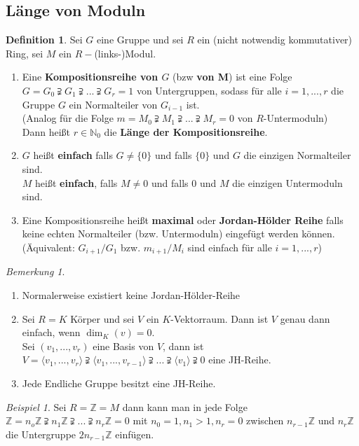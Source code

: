 \documentclass[10pt,a4paper]{article}
\newcommand{\N}{\ensuremath{\mathbb{N}}}
\newcommand{\Z}{\ensuremath{\mathbb{Z}}}
\newcounter{thm}[section]
\theoremstyle{definition}
\newtheorem{definition}[thm]{Definition}
\theoremstyle{plain}
\theoremstyle{remark}
\newtheorem{bem}[thm]{Bemerkung}
\newtheorem{exm}[thm]{Beispiel}
\begin{document}
\subsection{Länge von Moduln}

\begin{definition}
	Sei $G$ eine Gruppe und sei $R$ ein (nicht notwendig kommutativer) Ring, sei $M$ ein $R-$(links-)Modul.\begin{enumerate}
		\item Eine \textbf{Kompositionsreihe von $G$} (bzw \textbf{von M}) ist eine Folge $G=G_0\supsetneqq G_1\supsetneqq...\supsetneqq G_r=1$ von Untergruppen, sodass für alle $i=1,...,r$ die Gruppe $G$ ein Normalteiler von $G_{i-1}$ ist.\\
		(Analog für die Folge $m=M_0\supsetneqq M_1\supsetneqq...\supsetneqq M_r=0$ von $R$-Untermoduln)\\
		Dann heißt $r\in \N_0$ die \textbf{Länge der Kompositionsreihe}.
		\item $G$ heißt \textbf{einfach} falls $G\neq\{0\}$ und falls $\{0\}$ und $G$ die einzigen Normalteiler sind.\\
		$M$ heißt \textbf{einfach}, falls $M\neq 0$ und falls $0$ und $M$ die einzigen Untermoduln sind.
		\item Eine Kompositionsreihe heißt \textbf{maximal} oder \textbf{Jordan-Hölder Reihe} falls keine echten Normalteiler (bzw. Untermoduln) eingefügt werden können.\\
		(Äquivalent: $G_{i+1}/G_1$ bzw. $m_{i+1}/M_i$ sind einfach für alle $i=1,...,r$)
	\end{enumerate}
\end{definition}
\begin{bem}
	\begin{enumerate}
		\item Normalerweise existiert keine Jordan-Hölder-Reihe
		\item Sei $R=K$ Körper und sei $V$ ein $K$-Vektorraum. Dann ist $V$ genau dann einfach, wenn $\dim_K(v)=0$.\\
		Sei $(v_1,...,v_r)$ eine Basis von $V$, dann ist $V=\langle v_1,...,v_r\rangle\supsetneqq\langle v_1,...,v_{r-1}\rangle\supsetneqq...\supsetneqq \langle v_1\rangle \supsetneqq 0$ eine JH-Reihe.
		\item Jede Endliche Gruppe besitzt eine JH-Reihe.
	\end{enumerate}
\end{bem}

\addtocounter{thm}{-1}
\begin{exm}
	Sei $R=\Z=M$ dann kann man in jede Folge $\Z=n_o\Z\supsetneqq n_1\Z\supsetneqq...\supsetneqq n_r\Z=0$ mit $n_0=1, n_1>1,n_r=0$ zwischen $n_{r-1}\Z$ und $n_r\Z$ die Untergruppe $2n_{r-1}\Z$ einfügen.
\end{exm}
\end{document}
